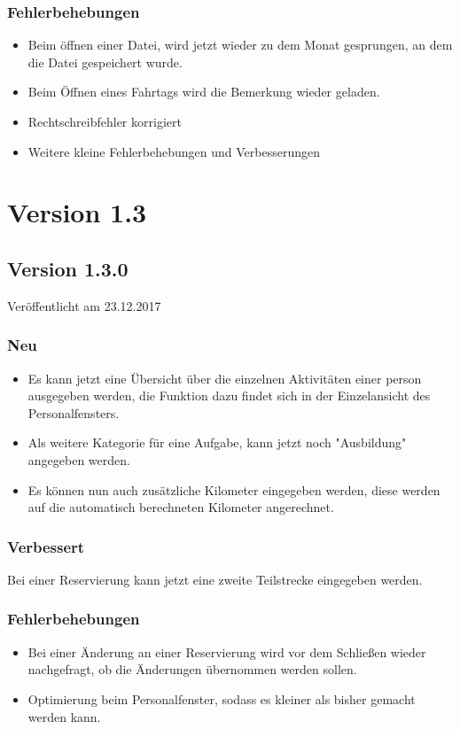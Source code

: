 \subsubsection{Fehlerbehebungen}
\begin{itemize}
  \item
  Beim öffnen einer Datei, wird jetzt wieder zu dem Monat gesprungen, an dem die Datei gespeichert wurde.
  \item
  Beim Öffnen eines Fahrtags wird die Bemerkung wieder geladen.
  \item
  Rechtschreibfehler korrigiert
  \item
  Weitere kleine Fehlerbehebungen und Verbesserungen
\end{itemize}



\section{Version 1.3}
\subsection{Version 1.3.0}
Veröffentlicht am 23.12.2017
\subsubsection{Neu}
\begin{itemize}
  \item
  Es kann jetzt eine Übersicht über die einzelnen Aktivitäten einer person ausgegeben werden, die Funktion dazu findet sich in der Einzelansicht des Personalfensters.
  \item
  Als weitere Kategorie für eine Aufgabe, kann jetzt noch "Ausbildung" angegeben werden.
  \item
  Es können nun auch zusätzliche Kilometer eingegeben werden, diese werden auf die automatisch berechneten Kilometer angerechnet.
\end{itemize}

\subsubsection{Verbessert}
Bei einer Reservierung kann jetzt eine zweite Teilstrecke eingegeben werden.

\subsubsection{Fehlerbehebungen}
\begin{itemize}
  \item
  Bei einer Änderung an einer Reservierung wird vor dem Schließen wieder nachgefragt, ob die Änderungen übernommen werden sollen.
  \item
  Optimierung beim Personalfenster, sodass es kleiner als bisher gemacht werden kann.
\end{itemize}


